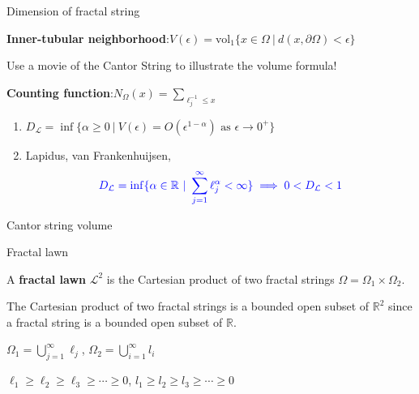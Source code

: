 \documentclass{if-beamer}
\newcommand{\R}{\mathbb{R}}
\begin{document}
\begin{frame}{Dimension of fractal string}

{\bf Inner-tubular neighborhood}:\quad $V(\epsilon) = \text{vol}_1\{x \in \Omega\ |\ d(x,\partial\Omega) < \epsilon\}$

\pause
\vspace{.2 in}

{\color{red} Use a movie of the Cantor String to illustrate the volume formula!}

\pause
\vspace{.2 in}

{\bf Counting function}:\quad $N_{\Omega}(x) = \sum_{\ell_j^{-1} \leq x}$





\begin{enumerate}
\item[] $D_{\mathcal{L}} = \inf\{\alpha \geq 0\ |\ V(\epsilon) = O(\epsilon^{1 - \alpha})\text{ as }\epsilon \to 0^+\}$ \\

\pause
\vspace{.2 in}

\item[] Lapidus, van Frankenhuijsen, \cite{lapidus2000fractal, lapidus2003complex, lapidus2012fractal}
\[ {\color{blue} D_\mathcal{L} = \inf\{\alpha \in \mathbb{R}\ |\ \sum_{j = 1}^\infty \ell_j^{\alpha} < \infty\} \implies 0 < D_{\mathcal{L}} < 1} \]
\end{enumerate}


\end{frame}

\begin{frame}{Cantor string volume}
	\begin{center}
	\end{center}
\end{frame}

\begin{frame}{Fractal lawn}

	\begin{definition}
	A {\bf fractal lawn} $\mathcal{L}^2$ is the Cartesian product of two fractal strings $\Omega=\Omega_1\times\Omega_2$.
	\end{definition}
	
	\pause
	\vspace{.2 in}
	
	The Cartesian product of two fractal strings is a bounded open subset of $\R^2$ since a fractal string is a bounded open subset of $\R$.
	\vspace{.2 in}
	
$\Omega_1 = \displaystyle\bigcup_{j = 1}^\infty\ell_j$, $\Omega_2 = \displaystyle\bigcup_{i = 1}^\infty l_i$
\vspace{.2 in}

$\ell_1 \geq \ell_2 \geq \ell_3 \geq \cdots \geq 0$, $l_1 \geq l_2 \geq l_3 \geq \cdots \geq 0$
\vspace{.2 in}

\end{frame}
\end{document}
